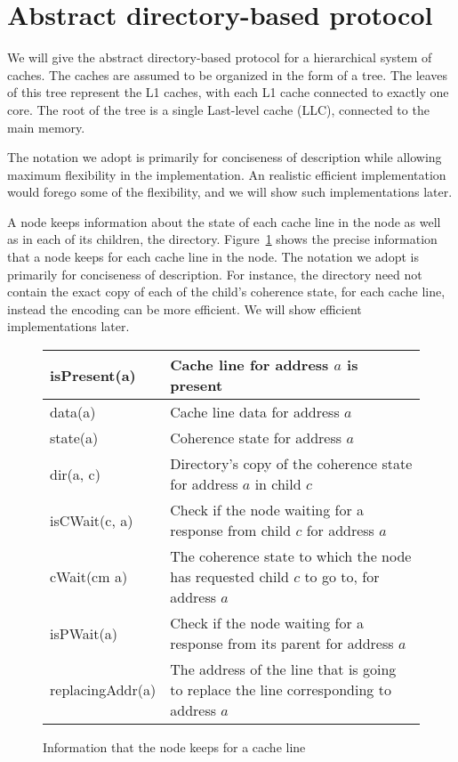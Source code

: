 \section{Abstract directory-based protocol}

\label{sec:abstract}

\newcommand{\One}[2]{\text{#1$\langle#2\rangle$}}
\newcommand{\two}[3]{\text{#1$\langle#2,#3\rangle$}}
\newcommand{\three}[4]{\text{#1$\langle#2,#3,#4\rangle$}}
\newcommand{\four}[5]{\text{#1$\langle#2,#3,#4,#5\rangle$}}
\newcommand{\True}{\texttt{True}}
\newcommand{\False}{\texttt{False}}
\newcommand{\assigns}{:=}
\newcommand{\AndAnd}{\;\&\&\;}
\newcommand{\OrOr}{\;||\;}

We will give the abstract directory-based protocol for a hierarchical system of
caches. The caches are assumed to be organized in the form of a tree. The leaves
of this tree represent the L1 caches, with each L1 cache connected to exactly
one core. The root of the tree is a single Last-level cache (LLC), connected to
the main memory.

The notation we adopt is primarily for conciseness of description while allowing
maximum flexibility in the implementation. An realistic efficient implementation
would forego some of the flexibility, and we will show such implementations
later.

A node keeps information about the state of each cache line in the node as well
as in each of its children, \ie the directory. Figure~\ref{table:states} shows
the precise information that a node keeps for each cache line in the node. The
notation we adopt is primarily for conciseness of description. For instance, the
directory need not contain the exact copy of each of the child's coherence
state, for each cache line, instead the encoding can be more efficient. We will
show efficient implementations later.

\begin{figure}
\begin{tabular}{|l|p{}|}
\hline
isPresent(a) & Cache line for address $a$ is present\\
\hline
data(a) & Cache line data for address $a$\\
\hline
state(a) & Coherence state for address $a$\\
\hline
dir(a, c) & Directory's copy of the coherence state for address $a$ in child
$c$\\
\hline
isCWait(c, a) & Check if the node waiting for a response from child $c$
for address $a$\\
\hline
cWait(cm a) & The coherence state to which the node has requested child $c$ to
go to, for address $a$\\
\hline
isPWait(a) & Check if the node waiting for a response from its parent for
address $a$\\
\hline
replacingAddr(a) & The address of the line that is going to replace the line
corresponding to address $a$\\
\hline
\end{tabular}
\caption{Information that the node keeps for a cache line}
\label{table:states}
\end{figure}

